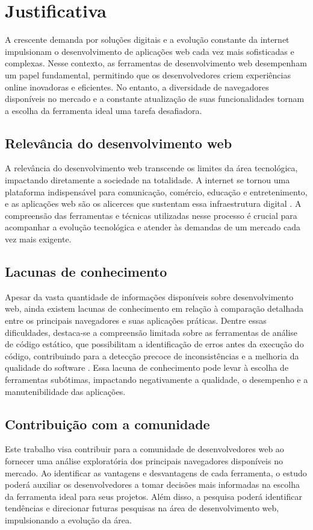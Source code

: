\chapter{Justificativa}
\label{chap:justificativa}

A crescente demanda por soluções digitais e a evolução constante da internet impulsionam o desenvolvimento de aplicações web cada vez mais sofisticadas e complexas. Nesse contexto, as ferramentas de desenvolvimento web desempenham um papel fundamental, permitindo que os desenvolvedores criem experiências online inovadoras e eficientes. No entanto, a diversidade de navegadores disponíveis no mercado e a constante atualização de suas funcionalidades tornam a escolha da ferramenta ideal uma tarefa desafiadora.

\section{Relevância do desenvolvimento web}
A relevância do desenvolvimento web transcende os limites da área tecnológica, impactando diretamente a sociedade na totalidade. A internet se tornou uma plataforma indispensável para comunicação, comércio, educação e entretenimento, e as aplicações web são os alicerces que sustentam essa infraestrutura digital \cite{tecnologia-web}. A compreensão das ferramentas e técnicas utilizadas nesse processo é crucial para acompanhar a evolução tecnológica e atender às demandas de um mercado cada vez mais exigente.

\section{Lacunas de conhecimento}
Apesar da vasta quantidade de informações disponíveis sobre desenvolvimento web, ainda existem lacunas de conhecimento em relação à comparação detalhada entre os principais navegadores e suas aplicações práticas. Dentre essas dificuldades, destaca-se a compreensão limitada sobre as ferramentas de análise de código estático, que possibilitam a identificação de erros antes da execução do código, contribuindo para a detecção precoce de inconsistências e a melhoria da qualidade do software \cite{odell_2014_pro}. Essa lacuna de conhecimento pode levar à escolha de ferramentas subótimas, impactando negativamente a qualidade, o desempenho e a manutenibilidade das aplicações.

\section{Contribuição com a comunidade}
Este trabalho visa contribuir para a comunidade de desenvolvedores web ao fornecer uma análise exploratória dos principais navegadores disponíveis no mercado. Ao identificar as vantagens e desvantagens de cada ferramenta, o estudo poderá auxiliar os desenvolvedores a tomar decisões mais informadas na escolha da ferramenta ideal para seus projetos. Além disso, a pesquisa poderá identificar tendências e direcionar futuras pesquisas na área de desenvolvimento web, impulsionando a evolução da área.
